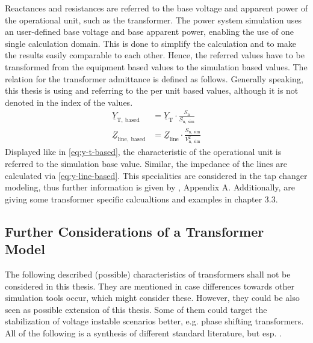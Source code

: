 Reactances and resistances are referred to the base voltage and apparent power of the operational unit, such as the transformer. 
The power system simulation uses an user-defined base voltage and base apparent power, enabling the use of one single calculation domain. 
This is done to simplify the calculation and to make the results easily comparable to each other. 
Hence, the referred values have to be transformed from the equipment based values to the simulation based values. 
The relation for the transformer admittance is defined as follows. 
Generally speaking, this thesis is using and referring to the per unit based values, although it is not denoted in the index of the values.
\begin{align}
    \underline{Y}_\mathrm{T,~based}&=\underline{Y}_\mathrm{T} \cdot \frac{S_\mathrm{n}}{S_\mathrm{n,~sim}} \label{eq:y-t-based} \\[6pt]
    \underline{Z}_\mathrm{line,~based}&=\underline{Z}_\mathrm{line} \cdot \frac{S_\mathrm{n,~sim}}{V_\mathrm{n,~sim}^2} \label{eq:y-line-based}
\end{align}
Displayed like in \autoref{eq:y-t-based}, the characteristic of the operational unit is referred to the simulation base value. 
Similar, the impedance of the lines are calculated via \autoref{eq:y-line-based}. 
This specialities are considered in the tap changer modeling, thus further information is given by \textcite{machowski_2020}, Appendix A.
Additionally, \textcite{glover_2017a} are giving some transformer specific calcualtions and examples in chapter 3.3.

\subsection{Further Considerations of a Transformer Model}
\label{sec:further-considerations}

The following described (possible) characteristics of transformers shall not be considered in this thesis.
They are mentioned in case differences towards other simulation tools occur, which might consider these.
However, they could be also seen as possible extension of this thesis.
Some of them could target the stabilization of voltage instable scenarios better, e.g. phase shifting transformers. 
All of the following is a synthesis of different standard literature, but esp. \autocite{schwab_2022,oeding_2016,machowski_2020,kundur_2022}.

